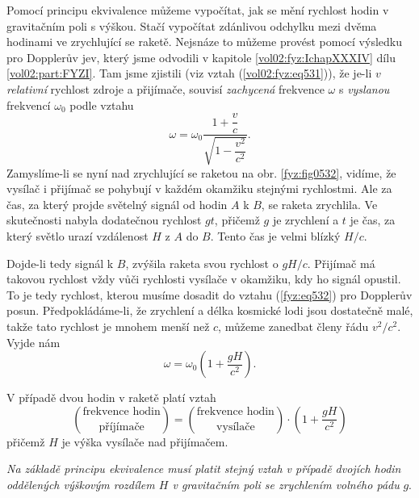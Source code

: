     Pomocí principu ekvivalence můžeme vypočítat, jak se mění rychlost hodin v gravitačním poli s
    výškou. Stačí vypočítat zdánlivou odchylku mezi dvěma hodinami ve zrychlující se raketě.
    Nejsnáze to můžeme provést pomocí výsledku pro Dopplerův jev, který jsme odvodili v kapitole
    \ref{vol02:fyz:IchapXXXIV} dílu \ref{vol02:part:FYZI}. Tam jsme zjistili (viz vztah
    (\ref{vol02:fyz:eq531})), že je-li \(v\) \emph{relativní} rychlost zdroje a přijímače, souvisí
    \emph{zachycená} frekvence \(\omega\) s \emph{vyslanou} frekvencí \(\omega_0\) podle vztahu
    \begin{equation}\label{fyz:eq532}
      \omega = \omega_0\dfrac{1+\dfrac{v}{c}}{\sqrt{1-\dfrac{v^2}{c^2}}}.
    \end{equation}
    Zamyslíme-li se nyní nad zrychlující se raketou na obr. \ref{fyz:fig0532}, vidíme, že vysílač i 
    přijímač se pohybují v každém okamžiku stejnými rychlostmi. Ale za čas, za který projde 
    světelný signál od hodin \(A\) k \(B\), se raketa zrychlila. Ve skutečnosti nabyla dodatečnou 
    rychlost \(gt\), přičemž \(g\) je zrychlení a \(t\) je čas, za který světlo urazí vzdálenost 
    \(H\) z \(A\) do \(B\). Tento čas je velmi blízký \(H/c\). 
    
    Dojde-li tedy signál k \(B\), zvýšila raketa svou rychlost o \(gH/c\). Přijímač má takovou 
    rychlost vždy vůči rychlosti vysílače v okamžiku, kdy ho signál opustil. To je tedy rychlost, 
    kterou musíme dosadit do vztahu (\ref{fyz:eq532}) pro Dopplerův posun. Předpokládáme-li, že 
    zrychlení a délka kosmické lodi jsou dostatečně malé, takže tato rychlost je mnohem menší než 
    \(c\), můžeme zanedbat členy řádu \(v^2/c^2\). Vyjde nám
    \begin{equation}\label{fyz:eq533}
      \omega = \omega_0\left(1 + \dfrac{gH}{c^2}\right).
    \end{equation}
    
    V případě dvou hodin v raketě platí vztah
    \begin{equation*}
      \binom{\text{frekvence hodin}}{\text{příjímače}} 
        = \binom{\text{frekvence hodin}}{\text{vysílače}}\cdot\left(1 + \dfrac{gH}{c^2}\right)
    \end{equation*}
    přičemž \(H\) je výška vysílače nad přijímačem. 
    
    \emph{Na základě principu ekvivalence musí platit stejný vztah v případě dvojích hodin 
    oddělených výškovým rozdílem \(H\) v gravitačním poli se zrychlením volného pádu} \(g\). 
    
